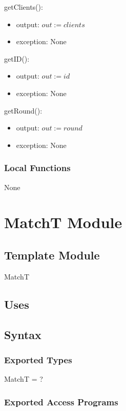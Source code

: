 \documentclass[12pt, titlepage]{article}
\begin{document}
\noindent getClients():
\begin{itemize}
\item output: $out := clients$
\item exception: None
\end{itemize}

\noindent getID():
\begin{itemize}
\item output: $out := id$
\item exception: None
\end{itemize}

\noindent getRound():
\begin{itemize}
\item output: $out := round$
\item exception: None
\end{itemize}

\subsubsection{Local Functions}

None
\newpage

\section{MatchT Module} \label{MatchT}

\subsection{Template Module}

MatchT

\subsection{Uses}


\subsection{Syntax}

\subsubsection{Exported Types}

MatchT = ?

\subsubsection{Exported Access Programs}
\end{document}
